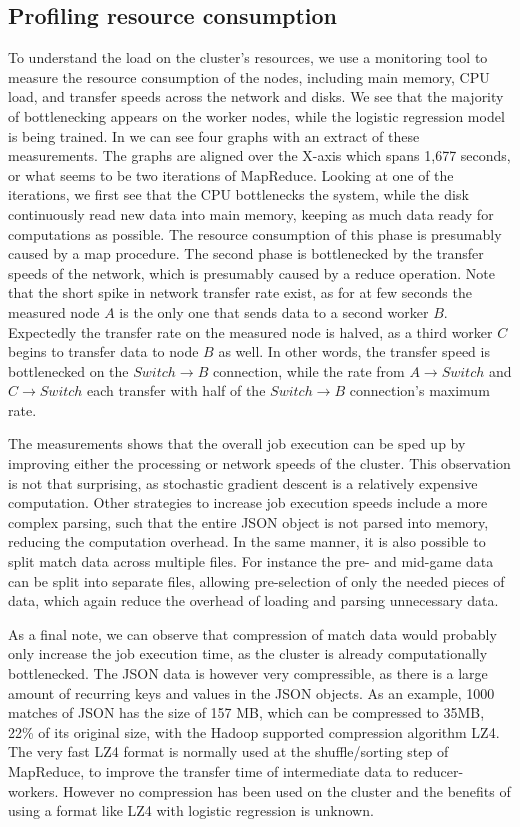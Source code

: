 \subsection{Profiling resource consumption}\label{sec:profile}
To understand the load on the cluster's resources, we use a monitoring tool to measure the resource consumption of the nodes, including main memory, CPU load, and transfer speeds across the network and disks. We see that the majority of bottlenecking appears on the worker nodes, while the logistic regression model is being trained. In 
we can see four graphs with an extract of these measurements. The graphs are aligned over the X-axis which spans 1,677 seconds, or what seems to be two iterations of MapReduce. Looking at one of the iterations, we first see that the CPU bottlenecks the system, while the disk continuously read new data into main memory, keeping as much data ready for computations as possible. The resource consumption of this phase is presumably caused by a map procedure. The second phase is bottlenecked by the transfer speeds of the network, which is presumably caused by a reduce operation. Note that the short spike in network transfer rate exist, as for at few seconds the measured node $A$ is the only one that sends data to a second worker $B$. Expectedly the transfer rate on the measured node is halved, as a third worker $C$ begins to transfer data to node $B$ as well. In other words, the transfer speed is bottlenecked on the $Switch \rightarrow B$ connection, while the rate from $A \rightarrow Switch$ and $C \rightarrow Switch$ each transfer with half of the $Switch \rightarrow B$ connection's maximum rate.

The measurements shows that the overall job execution can be sped up by improving either the processing or network speeds of the cluster. This observation is not that surprising, as stochastic gradient descent is a relatively expensive computation. Other strategies to increase job execution speeds include a more complex parsing, such that the entire JSON object is not parsed into memory, reducing the computation overhead. In the same manner, it is also possible to split match data across multiple files. For instance the pre- and mid-game data can be split into separate files, allowing pre-selection of only the needed pieces of data, which again reduce the overhead of loading and parsing unnecessary data.

As a final note, we can observe that compression of match data would probably only increase the job execution time, as the cluster is already computationally bottlenecked. The JSON data is however very compressible, as there is a large amount of recurring keys and values in the JSON objects. As an example, 1000 matches of JSON has the size of 157 MB, which can be compressed to 35MB, 22\% of its original size, with the Hadoop supported compression algorithm LZ4. The very fast LZ4 format is normally used at the shuffle/sorting step of MapReduce, to improve the transfer time of intermediate data to reducer-workers. However no compression has been used on the cluster and the benefits of using a format like LZ4 with logistic regression is unknown.

%


